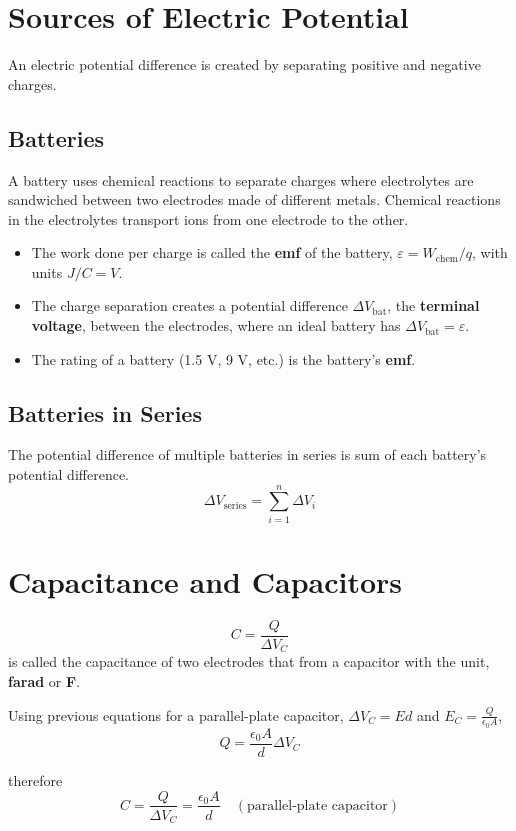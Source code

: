 \documentclass{article}
\begin{document}
\section*{Sources of Electric Potential}

An electric potential difference is created by separating positive and negative charges.

\subsection*{Batteries}
A battery uses chemical reactions to separate charges where electrolytes are sandwiched between two
electrodes made of different metals. Chemical reactions in the electrolytes transport ions from one
electrode to the other.
\begin{itemize}
    \item The work done per charge is called the \textbf{emf} of the battery,
    $\varepsilon = W_\text{chem}/q$, with units $J/C=V$.
    \item The charge separation creates a potential difference $\Delta V_\text{bat}$, the
    \textbf{terminal voltage}, between the electrodes, where an ideal battery has
    $\Delta V_\text{bat}=\varepsilon$.
    \item The rating of a battery (1.5 V, 9 V, etc.) is the battery's \textbf{emf}.
\end{itemize}

\subsection*{Batteries in Series}
The potential difference of multiple batteries in series is sum of each battery's potential
difference.
\[\Delta V_\text{series}=\sum_{i=1}^{n}\Delta V_i\]

\section*{Capacitance and Capacitors}

\[C=\frac{Q}{\Delta V_C}\] is called the capacitance of two electrodes that from a capacitor with
the unit, \textbf{farad} or \textbf{F}.
\newline

Using previous equations for a parallel-plate capacitor, $\Delta V_C=Ed$ and
$E_C=\frac{Q}{\epsilon_0 A}$,
\[Q=\frac{\epsilon_0 A}{d}\Delta V_C\]

therefore
\[C=\frac{Q}{\Delta V_C}=\frac{\epsilon_0 A}{d}\quad (\text{parallel-plate capacitor})\]
\end{document}
